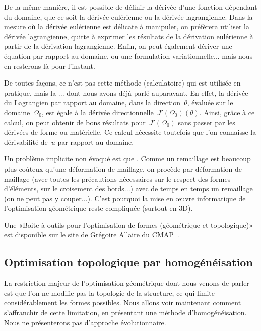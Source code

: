 De la même manière, il est possible de définir la dérivée d'une fonction dépendant du domaine, que ce soit la dérivée eulérienne ou la dérivée lagrangienne.
Dans la mesure où la dérivée eulérienne est délicate à manipuler, on préfèrera utiliser la dérivée lagrangienne, quitte à exprimer les résultats de la dérivation eulérienne à partir de la dérivation lagrangienne.
Enfin, on peut également dériver une équation par rapport au domaine, ou une formulation variationnelle... mais nous en resterons là pour l'instant.

De toutes façons, ce n'est pas cette méthode (calculatoire) qui est utilisée en pratique, mais la ... dont nous avons déjà parlé auparavant.
En effet, la dérivée du Lagrangien par rapport au domaine, dans la direction~$\theta$, évaluée sur le domaine~$\Omega_0$, est égale à la dérivée directionnelle~$J'(\Omega_0)(\theta)$.
Ainsi, grâce à ce calcul, on peut obtenir de bons résultats pour~$J'(\Omega_0)$ sans passer par les dérivées de forme ou matérielle. Ce calcul nécessite toutefois que l'on connaisse la dérivabilité de~$u$ par rapport au domaine.

\medskip
Un problème implicite non évoqué est que .
Comme un remaillage est beaucoup plus coûteux qu'une déformation de maillage, on procède par déformation de maillage (avec toutes les précautions nécessaires sur le respect des formes d'éléments, sur le croisement des bords...) avec de temps en temps un remaillage (on ne peut pas y couper...). C'est pourquoi la mise en œuvre informatique de l'optimisation géométrique reste compliquée (surtout en 3D).

Une «Boite à outils \freefem pour l'optimisation de formes (géométrique et topologique)» est disponible sur le site de Grégoire Allaire du CMAP~\cite{bib-AllaireOptimFF}.


\medskip
\subsection{Optimisation topologique par homogénéisation}

La restriction majeur de l'optimisation géométrique dont nous venons de parler est que l'on ne modifie pas la topologie de la structure, ce qui limite considérablement les formes possibles.
Nous allons voir maintenant comment s'affranchir de cette limitation, en présentant une méthode d'homogénéisation. Nous ne présenterons pas d'approche évolutionnaire.

